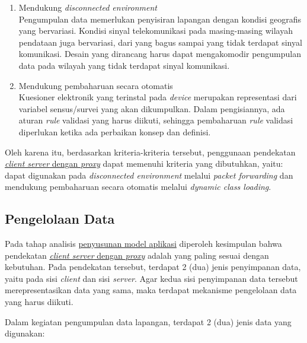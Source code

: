 \begin{enumerate}
\item Mendukung \textit{disconnected environment} \\
Pengumpulan data memerlukan penyisiran lapangan dengan kondisi geografis yang bervariasi. Kondisi sinyal telekomunikasi pada masing-masing wilayah pendataan juga bervariasi, dari yang bagus sampai yang tidak terdapat sinyal komunikasi. Desain yang dirancang harus dapat mengakomodir pengumpulan data pada wilayah yang tidak terdapat sinyal komunikasi.

\item Mendukung pembaharuan secara otomatis \\
Kuesioner elektronik yang terinstal pada \textit{device} merupakan representasi dari variabel sensus/survei yang akan dikumpulkan. Dalam pengisiannya, ada aturan \textit{rule} validasi yang harus diikuti, sehingga pembaharuan \textit{rule} validasi diperlukan ketika ada perbaikan konsep dan definisi.
\end{enumerate}

Oleh karena itu, berdasarkan kriteria-kriteria tersebut, penggunaan pendekatan \hyperref[sssec:client-server-proxy]{\textit{client server} dengan \textit{proxy}} dapat memenuhi kriteria yang dibutuhkan, yaitu: dapat digunakan pada \textit{disconnected environment} melalui \textit{packet forwarding} dan mendukung pembaharuan secara otomatis melalui \textit{dynamic class loading}.


\subsection{Pengelolaan Data}

Pada tahap analisis \hyperref[ssec:analysis-application-model]{penyusunan model aplikasi} diperoleh kesimpulan bahwa pendekatan \hyperref[sssec:client-server-proxy]{\textit{client server} dengan \textit{proxy}} adalah yang paling sesuai dengan kebutuhan. Pada pendekatan tersebut, terdapat 2 (dua) jenis penyimpanan data, yaitu pada sisi \textit{client} dan sisi \textit{server}. Agar kedua sisi penyimpanan data tersebut merepresentasikan data yang sama, maka terdapat mekanisme pengelolaan data yang harus diikuti.

Dalam kegiatan pengumpulan data lapangan, terdapat 2 (dua) jenis data yang digunakan:

